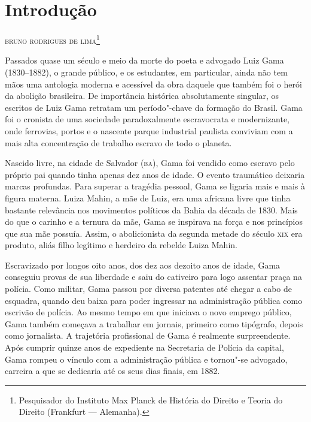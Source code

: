 \chapter{Introdução}

\begin{flushright}
\textsc{bruno rodrigues de lima}\footnote[*]{Pesquisador do Instituto Max Planck de História do Direito e Teoria do
Direito (Frankfurt --- Alemanha).}
\end{flushright}
\bigskip


Passados quase um século e meio da morte do poeta e advogado Luiz Gama
(1830--1882), o grande público, e os estudantes, em particular, ainda não
tem mãos uma antologia moderna e acessível da obra daquele que também
foi o herói da abolição brasileira. De importância histórica
absolutamente singular, os escritos de Luiz Gama retratam um
período"-chave da formação do Brasil. Gama foi o cronista de uma
sociedade paradoxalmente escravocrata e modernizante, onde ferrovias,
portos e o nascente parque industrial paulista conviviam com a mais
alta concentração de trabalho escravo de todo o planeta.

Nascido livre, na cidade de Salvador (\textsc{ba}), Gama foi vendido como escravo
pelo próprio pai quando tinha apenas dez anos de idade. O evento
traumático deixaria marcas profundas. Para superar a tragédia pessoal,
Gama se ligaria mais e mais à figura materna. Luiza Mahin, a mãe de
Luiz, era uma africana livre que tinha bastante relevância nos
movimentos políticos da Bahia da década de 1830. Mais do que o carinho e
a ternura da mãe, Gama se inspirava na força e nos princípios que sua
mãe possuía. Assim, o abolicionista da segunda metade do século \textsc{xix} era
produto, aliás filho legítimo e herdeiro da rebelde Luiza Mahin.

Escravizado por longos oito anos, dos dez aos dezoito anos de idade,
Gama conseguiu provas de sua liberdade e saiu do cativeiro para logo
assentar praça na polícia. Como militar, Gama passou por diversa
patentes até chegar a cabo de esquadra, quando deu baixa para poder
ingressar na administração pública como escrivão de polícia. Ao mesmo
tempo em que iniciava o novo emprego público, Gama também começava a
trabalhar em jornais, primeiro como tipógrafo, depois como jornalista. A
trajetória profissional de Gama é realmente surpreendente. Após cumprir
quinze anos de expediente na Secretaria de Polícia da capital, Gama
rompeu o vínculo com a administração pública e tornou"-se advogado,
carreira a que se dedicaria até os seus dias finais, em 1882.

